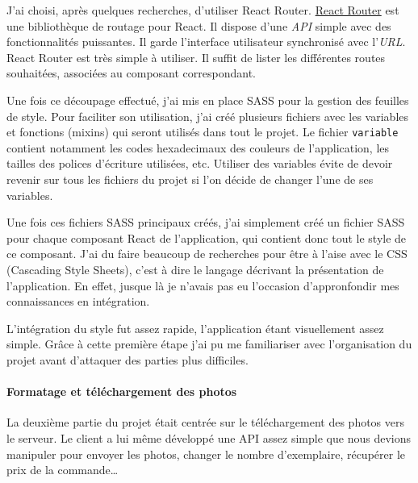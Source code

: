 \documentclass[12pt,a4paper]{article}
\begin{document}
  J'ai choisi, après quelques recherches, d'utiliser React Router.
  \href{https://github.com/ReactTraining/react-router}{React Router} est
  une bibliothèque de routage pour React. Il dispose d'une \emph{API}
  simple avec des fonctionnalités puissantes. Il garde l'interface
  utilisateur synchronisé avec l'\emph{URL}. React Router est très simple
  à utiliser. Il suffit de lister les différentes routes souhaitées,
  associées au composant correspondant.

  \bigskip

  Une fois ce découpage effectué, j'ai mis en place SASS pour la gestion
  des feuilles de style. Pour faciliter son utilisation, j'ai créé
  plusieurs fichiers avec les variables et fonctions (mixins) qui seront
  utilisés dans tout le projet. Le fichier \texttt{variable} contient
  notamment les codes hexadecimaux des couleurs de l'application, les
  tailles des polices d'écriture utilisées, etc. Utiliser des variables
  évite de devoir revenir sur tous les fichiers du projet si l'on décide
  de changer l'une de ses variables.

  \bigskip

  Une fois ces fichiers SASS principaux créés, j'ai simplement créé un
  fichier SASS pour chaque composant React de l'application, qui contient
  donc tout le style de ce composant. J'ai du faire beaucoup de recherches
  pour être à l'aise avec le CSS (Cascading Style Sheets), c'est à dire le
  langage décrivant la présentation de l'application. En effet, jusque là
  je n'avais pas eu l'occasion d'appronfondir mes connaissances en
  intégration.

  \bigskip

  L'intégration du style fut assez rapide, l'application étant
  visuellement assez simple. Grâce à cette première étape j'ai pu me
  familiariser avec l'organisation du projet avant d'attaquer des parties
  plus difficiles.

  \bigskip

  \paragraph{Formatage et téléchargement des
  photos}\label{formatage-et-tuxe9luxe9chargement-des-photos}

  \bigskip

  La deuxième partie du projet était centrée sur le téléchargement des
  photos vers le serveur. Le client a lui même développé une API assez
  simple que nous devions manipuler pour envoyer les photos, changer le
  nombre d'exemplaire, récupérer le prix de la commande\ldots{}
\end{document}
